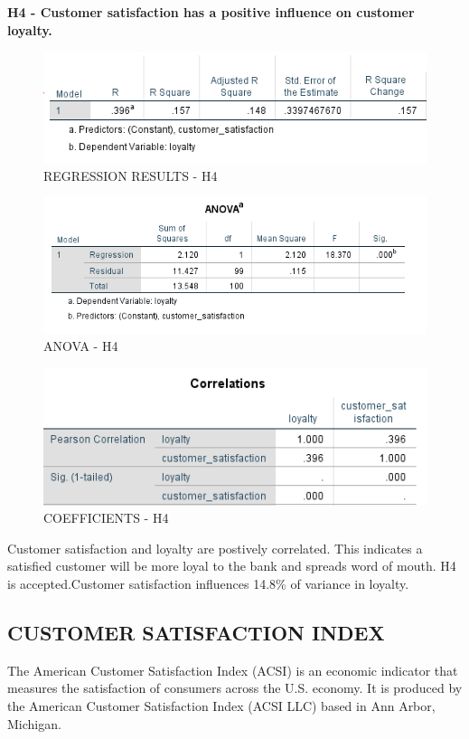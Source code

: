 \documentclass[a4paper, 12pt]{extarticle}
\begin{document}
{\newpage
\par \textbf{H4 - Customer satisfaction has a positive influence on customer loyalty.}\\
\begin{figure}[H]
\centering
\includegraphics[scale=1]{customer_satisfaction_vs_loyalty.png}
\caption{REGRESSION RESULTS - H4}
\end{figure}
\begin{figure}[H]
\centering
\includegraphics[scale=1]{anova_cs_lo.png}
\caption{ANOVA - H4}
\end{figure}

\begin{figure}[H]
\centering
\includegraphics[scale=1]{h4.png}
\caption{COEFFICIENTS - H4}
\end{figure}

Customer satisfaction and loyalty are postively correlated. This indicates a satisfied customer will be more loyal to the bank and spreads word of mouth. H4 is accepted.Customer satisfaction influences 14.8\% of variance in loyalty.

\newpage
\subsection{CUSTOMER SATISFACTION INDEX}
The American Customer Satisfaction Index (ACSI) is an economic indicator that measures the satisfaction of consumers across the U.S. economy. It is produced by the American Customer Satisfaction Index (ACSI LLC) based in Ann Arbor, Michigan.

}
\end{document}
